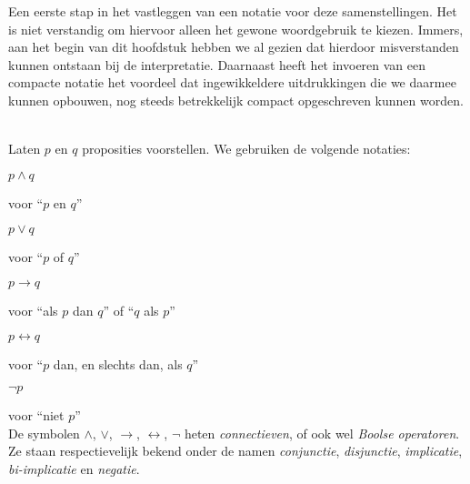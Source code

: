 Een eerste stap in het vastleggen van een notatie voor deze samenstellingen. Het is niet verstandig om hiervoor alleen het gewone woordgebruik te kiezen. Immers, aan het begin van dit hoofdstuk hebben we al gezien dat hierdoor misverstanden kunnen ontstaan bij de interpretatie. Daarnaast heeft het invoeren van een compacte notatie het voordeel dat ingewikkeldere uitdrukkingen die we daarmee kunnen opbouwen, nog steeds betrekkelijk compact opgeschreven kunnen worden.
\begin{notation}\mbox{}\\
Laten $p$ en $q$ proposities voorstellen. We gebruiken de volgende notaties:\\

  \noindent\parbox{2cm}{$p\land q$} voor \enquote{$p$ en $q$}\\
  \noindent\parbox{2cm}{$p\lor q$} voor \enquote{$p$ of $q$}\\
  \noindent\parbox{2cm}{$p\rightarrow q$} voor \enquote{als $p$ dan $q$} of \enquote{$q$ als $p$}\\
  \noindent\parbox{2cm}{$p\leftrightarrow q$} voor \enquote{$p$ dan, en slechts dan, als $q$}\\
  \noindent\parbox{2cm}{$\neg p$} voor \enquote{niet $p$}\\


\noindent
De symbolen $\land$, $\lor$, $\rightarrow$, $\leftrightarrow$, $\neg$ heten \textit{connectieven}, of ook wel \textit{Boolse operatoren}. Ze staan respectievelijk bekend onder de namen \textit{conjunctie}, \textit{disjunctie}, \textit{implicatie}, \textit{bi-implicatie} en \textit{negatie}.
\end{notation}

